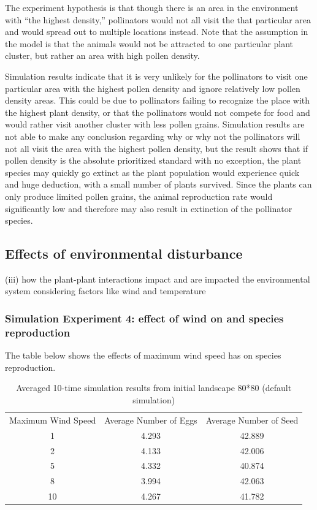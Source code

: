 \documentclass[3p,,preprint,12pt]{elsarticle}
\begin{document}
The experiment hypothesis is that though there is an area in the environment with “the highest density,” pollinators would not all visit the that particular area and would spread out to multiple locations instead. Note that the assumption in the model is that the animals would not be attracted to one particular plant cluster, but rather an area with high pollen density. 

Simulation results indicate that it is very unlikely for the pollinators to visit one particular area with the highest pollen density and ignore relatively low pollen density areas. This could be due to pollinators failing to recognize the place with the highest plant density, or that the pollinators would not compete for food and would rather visit another cluster with less pollen grains. Simulation results are not able to make any conclusion regarding why or why not the pollinators will not all visit the area with the highest pollen density, but the result shows that if pollen density is the absolute prioritized standard with no exception, the plant species may quickly go extinct as the plant population would experience quick and huge deduction, with a small number of plants survived. Since the plants can only produce limited pollen grains, the animal reproduction rate would significantly low and therefore may also result in extinction of the pollinator species.

\subsection{Effects of environmental disturbance}
(iii) how the plant-plant interactions impact and are impacted the environmental system considering factors like wind and temperature

\subsubsection{Simulation Experiment 4: effect of wind on and species reproduction}
The table below shows the effects of maximum wind speed has on species reproduction.
    \begin{table}[!htb]
    \begin{center}
    \begin{tabular}{ c c c }
    Maximum Wind Speed & Average Number of Eggs & Average Number of Seed \\
    1 & 4.293 & 42.889 \\
    2 & 4.133 & 42.006 \\
    5 & 4.332 & 40.874 \\ 
    8 & 3.994 & 42.063 \\
    10 & 4.267 & 41.782 \\
    \end{tabular}
    \caption{\label{tab:table-name} Averaged 10-time simulation results from initial landscape 80*80 (default simulation)}
    \end{center}
    \end{table}
\end{document}
